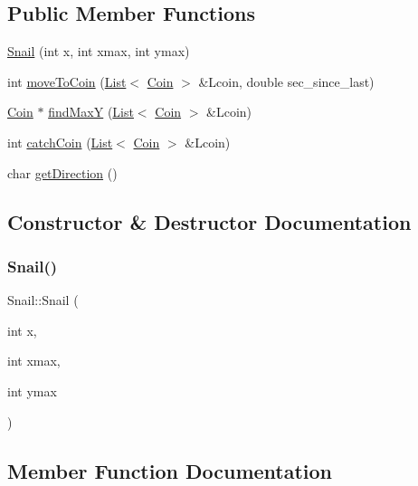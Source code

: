 \subsection*{Public Member Functions}
\begin{DoxyCompactItemize}
\item 
\mbox{\hyperlink{class_snail_ad780249a02a8d7a850ccb7255a0cdf14}{Snail}} (int x, int xmax, int ymax)
\item 
int \mbox{\hyperlink{class_snail_ac02f07964ad0a0db28204acc7ed294b7}{move\+To\+Coin}} (\mbox{\hyperlink{class_list}{List}}$<$ \mbox{\hyperlink{class_coin}{Coin}} $>$ \&Lcoin, double sec\+\_\+since\+\_\+last)
\item 
\mbox{\hyperlink{class_coin}{Coin}} $\ast$ \mbox{\hyperlink{class_snail_a1dd9e6d2229dfc452f0163948c7f1980}{find\+MaxY}} (\mbox{\hyperlink{class_list}{List}}$<$ \mbox{\hyperlink{class_coin}{Coin}} $>$ \&Lcoin)
\item 
int \mbox{\hyperlink{class_snail_a2a9deee0c65a5d30f92efd054c6d4155}{catch\+Coin}} (\mbox{\hyperlink{class_list}{List}}$<$ \mbox{\hyperlink{class_coin}{Coin}} $>$ \&Lcoin)
\item 
char \mbox{\hyperlink{class_snail_a5b4774b31b0eb0253910680d4e49f403}{get\+Direction}} ()
\end{DoxyCompactItemize}


\subsection{Constructor \& Destructor Documentation}
\mbox{\label{class_snail_ad780249a02a8d7a850ccb7255a0cdf14}} 
\subsubsection{\texorpdfstring{Snail()}{Snail()}}
{\footnotesize\ttfamily Snail\+::\+Snail (\begin{DoxyParamCaption}\item[{int}]{x,  }\item[{int}]{xmax,  }\item[{int}]{ymax }\end{DoxyParamCaption})}



\subsection{Member Function Documentation}
\mbox{\label{class_snail_a2a9deee0c65a5d30f92efd054c6d4155}} 
